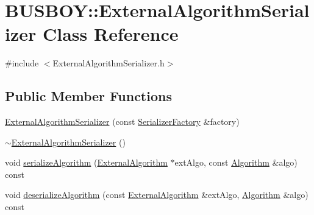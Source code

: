 \hypertarget{classBUSBOY_1_1ExternalAlgorithmSerializer}{
\section{BUSBOY::ExternalAlgorithmSerializer Class Reference}
\label{classBUSBOY_1_1ExternalAlgorithmSerializer}
}


{\ttfamily \#include $<$ExternalAlgorithmSerializer.h$>$}\subsection*{Public Member Functions}
\begin{DoxyCompactItemize}
\item 
\hyperlink{classBUSBOY_1_1ExternalAlgorithmSerializer_a3e074df8096623c01b69feadeaefa144}{ExternalAlgorithmSerializer} (const \hyperlink{classBUSBOY_1_1SerializerFactory}{SerializerFactory} \&factory)
\item 
\hyperlink{classBUSBOY_1_1ExternalAlgorithmSerializer_a8451bfb70e7c6f076208c93a744479e1}{$\sim$ExternalAlgorithmSerializer} ()
\item 
void \hyperlink{classBUSBOY_1_1ExternalAlgorithmSerializer_a7dee865fb56d7d108d23a739891823c5}{serializeAlgorithm} (\hyperlink{classBUSBOY_1_1ExternalAlgorithm}{ExternalAlgorithm} $\ast$extAlgo, const \hyperlink{classBUSBOY_1_1Algorithm}{Algorithm} \&algo) const 
\item 
void \hyperlink{classBUSBOY_1_1ExternalAlgorithmSerializer_a2b797895bfe95272cc5d53d08381a10c}{deserializeAlgorithm} (const \hyperlink{classBUSBOY_1_1ExternalAlgorithm}{ExternalAlgorithm} \&extAlgo, \hyperlink{classBUSBOY_1_1Algorithm}{Algorithm} \&algo) const 
\end{DoxyCompactItemize}


